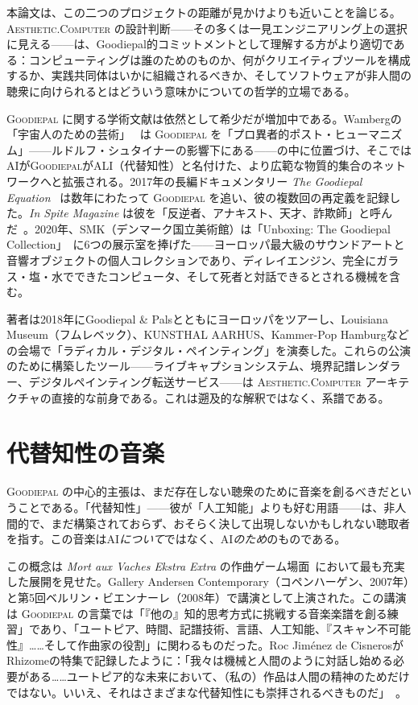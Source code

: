 \documentclass[10pt,letterpaper,twocolumn]{article}
\newcommand{\ac}{\textsc{Aesthetic.Computer}}
\newcommand{\gp}{\textsc{Goodiepal}}
\begin{document}
本論文は、この二つのプロジェクトの距離が見かけよりも近いことを論じる。\ac{} の設計判断——その多くは一見エンジニアリング上の選択に見える——は、Goodiepal的コミットメントとして理解する方がより適切である：コンピューティングは誰のためのものか、何がクリエイティブツールを構成するか、実践共同体はいかに組織されるべきか、そしてソフトウェアが非人間の聴衆に向けられるとはどういう意味かについての哲学的立場である。

\gp{} に関する学術文献は依然として希少だが増加中である。Wambergの「宇宙人のための芸術」~\citep{wamberg2022artforaliens} は \gp{} を「プロ異者的ポスト・ヒューマニズム」——ルドルフ・シュタイナーの影響下にある——の中に位置づけ、そこではAIが\gp{}がALI（代替知性）と名付けた、より広範な物質的集合のネットワークへと拡張される。2017年の長編ドキュメンタリー \emph{The Goodiepal Equation}~\citep{sanpakkila2017equation} は数年にわたって \gp{} を追い、彼の複数回の再定義を記録した。\emph{In Spite Magazine} は彼を「反逆者、アナキスト、天才、詐欺師」と呼んだ~\citep{inspite2024goodiepal}。2020年、SMK（デンマーク国立美術館）は「Unboxing: The Goodiepal Collection」~\citep{smk2020unboxing}に6つの展示室を捧げた——ヨーロッパ最大級のサウンドアートと音響オブジェクトの個人コレクションであり、ディレイエンジン、完全にガラス・塩・水でできたコンピュータ、そして死者と対話できるとされる機械を含む。

著者は2018年にGoodiepal \& Palsとともにヨーロッパをツアーし、Louisiana Museum（フムレベック）、KUNSTHAL AARHUS、Kammer-Pop Hamburgなどの会場で「ラディカル・デジタル・ペインティング」を演奏した。これらの公演のために構築したツール——ライブキャプションシステム、境界記譜レンダラー、デジタルペインティング転送サービス——は \ac{} アーキテクチャの直接的な前身である。これは遡及的な解釈ではなく、系譜である。

\section{代替知性の音楽}

\gp{} の中心的主張は、まだ存在しない聴衆のために音楽を創るべきだということである。「代替知性」——彼が「人工知能」よりも好む用語——は、非人間的で、まだ構築されておらず、おそらく決して出現しないかもしれない聴取者を指す。この音楽はAI\emph{について}ではなく、AI\emph{のため}のものである。

この概念は \emph{Mort aux Vaches Ekstra Extra} の作曲ゲーム場面~\citep{goodiepal2007mortauxvaches}において最も充実した展開を見せた。Gallery Andersen Contemporary（コペンハーゲン、2007年）と第5回ベルリン・ビエンナーレ（2008年）で講演として上演された。この講演は \gp{} の言葉では「『他の』知的思考方式に挑戦する音楽楽譜を創る練習」であり、「ユートピア、時間、記譜技術、言語、人工知能、『スキャン不可能性』……そして作曲家の役割」に関わるものだった。Roc Jim\'enez de CisnerosがRhizomeの特集で記録したように：「我々は機械と人間のように対話し始める必要がある……ユートピア的な未来において、（私の）作品は人間の精神のためだけではない。いいえ、それはさまざまな代替知性にも崇拝されるべきものだ」~\citep{rhizome2011goodiepal}。
\end{document}
